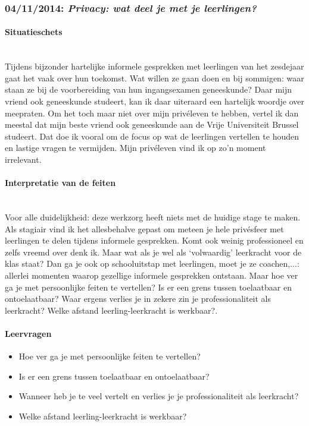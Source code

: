 \documentclass[a4paper,11pt]{article}
\newcommand{\tussen}[1]{\paragraph*{#1}\mbox{}\\}
\theoremstyle{definition}
\begin{document}
\subsubsection{04/11/2014: \emph{Privacy: wat deel je met je leerlingen?}}
\tussen{Situatieschets}
Tijdens bijzonder hartelijke informele gesprekken met leerlingen van het zesdejaar gaat het vaak over hun toekomst. 
Wat willen ze gaan doen en bij sommigen: waar staan ze bij de voorbereiding van hun ingangsexamen geneeskunde? Daar mijn vriend ook geneeskunde 
studeert, kan ik daar uiteraard een hartelijk woordje over meepraten. Om het toch maar niet over mijn privéleven te hebben, vertel ik dan meestal dat mijn beste vriend ook geneeskunde aan de Vrije Universiteit Brussel studeert. 
Dat doe ik vooral om de focus op wat de leerlingen vertellen te houden en lastige vragen te vermijden. Mijn privéleven vind ik op zo’n moment irrelevant.
\tussen{Interpretatie van de feiten}
Voor alle duidelijkheid: deze werkzorg heeft niets met de huidige stage te maken.
 Als stagiair vind ik het allesbehalve gepast om meteen je hele privésfeer met leerlingen te delen tijdens informele gesprekken. Komt ook weinig professioneel en zelfs vreemd over denk ik. 
 Maar wat als je wel als `volwaardig' leerkracht voor de klas staat? Dan ga je ook op schooluitstap met leerlingen, moet je ze coachen,...: allerlei momenten waarop gezellige informele gesprekken ontstaan. 
 Maar hoe ver ga je met persoonlijke feiten te vertellen? Is er een grens tussen toelaatbaar en ontoelaatbaar? Waar ergens verlies je in zekere zin je professionaliteit als leerkracht? Welke afstand leerling-leerkracht is werkbaar?.
 \paragraph*{Leervragen}
\begin{itemize}
  \item Hoe ver ga je met persoonlijke feiten te vertellen?
\item Is er een grens tussen toelaatbaar en ontoelaatbaar?
\item Wanneer heb je te veel vertelt en verlies je je professionaliteit als leerkracht?
\item Welke afstand leerling-leerkracht is werkbaar?
\end{itemize}   
\end{document}
